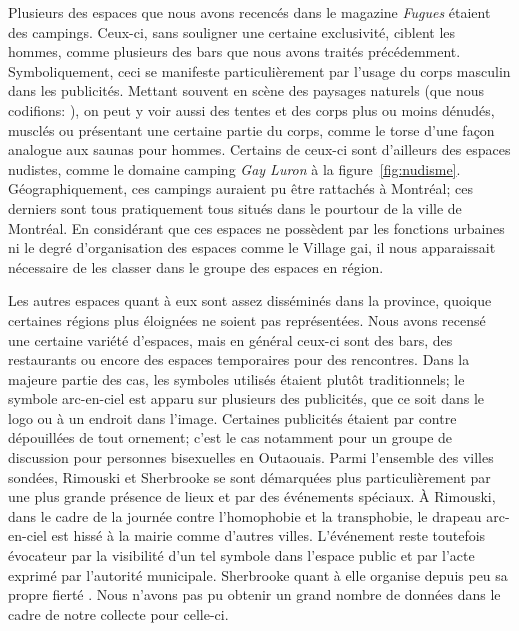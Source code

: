 Plusieurs des espaces que nous avons recencés dans le magazine \emph{Fugues} étaient des campings.
Ceux-ci, sans souligner une certaine exclusivité, ciblent les hommes, comme plusieurs des bars que nous avons traités précédemment.
Symboliquement, ceci se manifeste particulièrement par l'usage du corps masculin dans les publicités.
Mettant souvent en scène des paysages naturels (que nous codifions: ), on peut y voir aussi des tentes et des corps plus ou moins dénudés, musclés ou présentant une certaine partie du corps, comme le torse d'une façon analogue aux saunas pour hommes.
Certains de ceux-ci sont d'ailleurs des espaces nudistes, comme le domaine camping \emph{Gay Luron} à la figure~\ref{fig:nudisme}.
Géographiquement, ces campings auraient pu être rattachés à Montréal; ces derniers sont tous pratiquement tous situés dans le pourtour de la ville de Montréal.
En considérant que ces espaces ne possèdent par les fonctions urbaines ni le degré d'organisation des espaces comme le Village gai, il nous apparaissait nécessaire de les classer dans le groupe des espaces en région.

Les autres espaces quant à eux sont assez disséminés dans la province, quoique certaines régions plus éloignées ne soient pas représentées.
Nous avons recensé une certaine variété d'espaces, mais en général ceux-ci sont des bars, des restaurants ou encore des espaces temporaires pour des rencontres.
Dans la majeure partie des cas, les symboles utilisés étaient plutôt traditionnels; le symbole arc-en-ciel est apparu sur plusieurs des publicités, que ce soit dans le logo ou à un endroit dans l'image.
Certaines publicités étaient par contre dépouillées de tout ornement; c'est le cas notamment pour un groupe de discussion pour personnes bisexuelles en Outaouais.
Parmi l'ensemble des villes sondées, Rimouski et Sherbrooke se sont démarquées plus particulièrement par une plus grande présence de lieux et par des événements spéciaux.
À Rimouski, dans le cadre de la journée contre l'homophobie et la transphobie, le drapeau arc-en-ciel est hissé à la mairie comme d'autres villes.
L'événement reste toutefois évocateur par la visibilité d'un tel symbole dans l'espace public et par l'acte exprimé par l'autorité municipale.
Sherbrooke quant à elle organise depuis peu sa propre fierté \lgbt{}.
Nous n'avons pas pu obtenir un grand nombre de données dans le cadre de notre collecte pour celle-ci.

